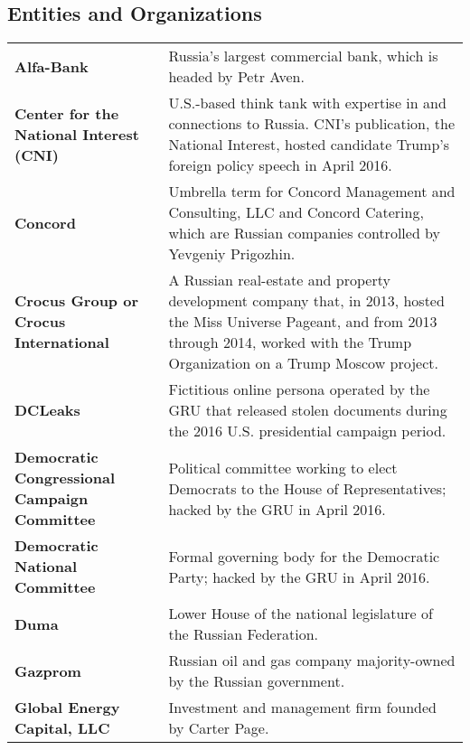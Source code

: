 \subsection{Entities and Organizations}

\begin{longtable}{ p{} p{} }

    \textbf{Alfa-Bank} & Russia's largest commercial bank, which is headed by Petr Aven. \\

    \textbf{Center for the National Interest (CNI)} & U.S.-based think tank with expertise in and connections to Russia. CNI's publication, the National Interest, hosted candidate Trump's foreign policy speech in April 2016. \\

    \textbf{Concord} & Umbrella term for Concord Management and Consulting, LLC and Concord Catering, which are Russian companies controlled by Yevgeniy Prigozhin. \\

    \textbf{Crocus Group or Crocus International} & A Russian real-estate and property development company that, in 2013, hosted the Miss Universe Pageant, and from 2013 through 2014, worked with the Trump Organization on a Trump Moscow project. \\

    \textbf{DCLeaks} & Fictitious online persona operated by the GRU that released stolen documents during the 2016 U.S. presidential campaign period. \\

    \textbf{Democratic Congressional Campaign Committee} & Political committee working to elect Democrats to the House of Representatives; hacked by the GRU in April 2016. \\

    \textbf{Democratic National Committee} & Formal governing body for the Democratic Party; hacked by the GRU in April 2016. \\

    \textbf{Duma} & Lower House of the national legislature of the Russian Federation. \\

    \textbf{Gazprom} & Russian oil and gas company majority-owned by the Russian government. \\

    \textbf{Global Energy Capital, LLC} & Investment and management firm founded by Carter Page. \\


\end{longtable}
